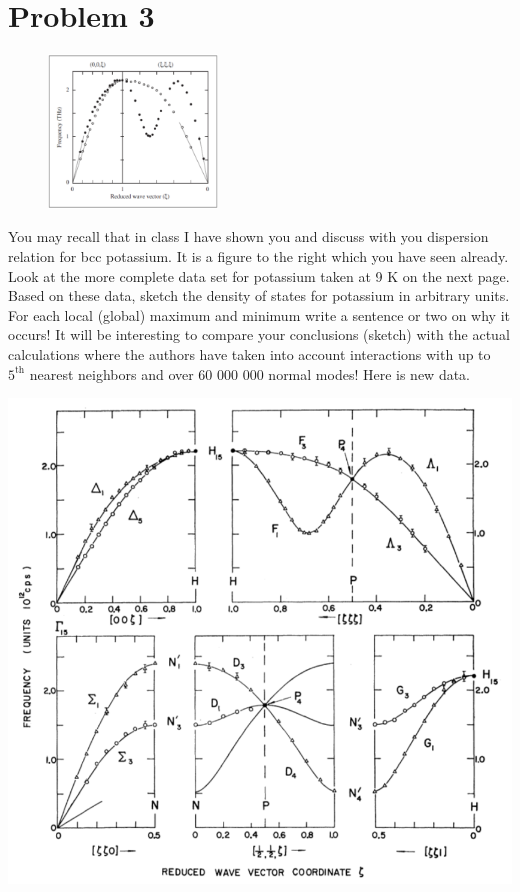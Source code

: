 \documentclass{article}
\begin{document}
\section*{Problem 3}
\begin{figure}
    \begin{center}
        \includegraphics[width = 0.4\textwidth]{single frequency mode.PNG}
    \end{center}
\end{figure}
You may recall that in class I have shown you and discuss with you dispersion relation for bcc potassium. 
It is a figure to the right which you have seen already. 
Look at the more complete data set for potassium taken at 9 K on the next page. 
Based on these data, sketch the density of states for potassium in arbitrary units. For each local (global) maximum and minimum write a sentence or two on why it occurs!
It will be interesting to compare your conclusions (sketch) with the actual calculations where the authors have taken into account interactions with up to $5^{\text{th}}$ nearest neighbors and over 60 000 000 normal modes! Here is new data.
\newline\newline
\begin{center}
    \includegraphics[scale = 0.6]{frequency modes.PNG}
\end{center}
\end{document}
